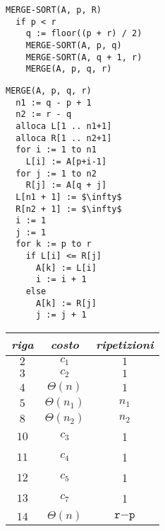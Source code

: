 \documentclass[italian, 10pt]{article}
\begin{document}
\begin{minipage}{0.99\textwidth}
  \begin{lstlisting}[style=pseudocode, caption={Pseudocodice dell'algoritmo \texttt{MERGE-SORT}}, label={lst:pseudocodice-merge-sort}]
MERGE-SORT(A, p, R)
  if p < r
    q := floor((p + r) / 2)
    MERGE-SORT(A, p, q)
    MERGE-SORT(A, q + 1, r)
    MERGE(A, p, q, r)
\end{lstlisting}

  \begin{minipage}{0.99\textwidth}
    \centering
    \begin{minipage}[t]{0.495\textwidth}
      \begin{lstlisting}[style=pseudocode, caption={Pseudocodice dell'algoritmo \texttt{MERGE}}, label={lst:pseudocodice-merge}]
MERGE(A, p, q, r)
  n1 := q - p + 1
  n2 := r - q
  alloca L[1 .. n1+1]
  alloca R[1 .. n2+1]
  for i := 1 to n1
    L[i] := A[p+i-1]
  for j := 1 to n2
    R[j] := A[q + j]
  L[n1 + 1] := $\infty$
  R[n2 + 1] := $\infty$
  i := 1
  j := 1
  for k := p to r
    if L[i] <= R[j]
      A[k] := L[i]
      i := i + 1
    else
      A[k] := R[j]
      j := j + 1
          \end{lstlisting}
    \end{minipage}
    \begin{minipage}[t]{0.495\textwidth}
      \begin{tabular}[t]{ccc}
        \textit{riga} & \textit{costo}  & \textit{ripetizioni}        \\ \hline
        \(2\)         & \(c_1\)         & \(1\)                       \\
        \(3\)         & \(c_2\)         & \(1\)                       \\
        \(4\)         & \(\Theta(n)\)   & \(1\)                       \\
        \(5\)         & \(\Theta(n_1)\) & \(n_1\)                     \\
        \(8\)         & \(\Theta(n_2)\) & \(n_2\)                     \\
        \(10\)        & \(c_3\)         & 1                           \\
        \(11\)        & \(c_4\)         & 1                           \\
        \(12\)        & \(c_5\)         & 1                           \\
        \(13\)        & \(c_7\)         & 1                           \\
        \(14\)        & \(\Theta(n)\)   & \(\texttt{r} - \texttt{p}\) \\

\end{tabular}
\end{minipage}
\end{minipage}
\end{minipage}
\end{document}
